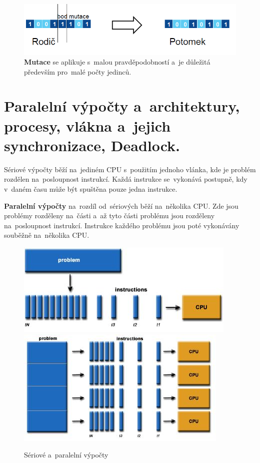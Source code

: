 \begin{figure}[ht]
	\includegraphics[scale=0.7]{images/mutace.PNG}
	\caption{\textbf{Mutace} se aplikuje s~malou pravděpodobností a~je důležitá především pro~malé počty jedinců.}
	\label{mutace}
\end{figure}

\clearpage
\section{Paralelní výpočty a~architektury, procesy, vlákna a~jejich synchronizace, Deadlock.}

Sériové výpočty běží na~jediném CPU s~použitím jednoho vlánka, kde je problém rozdělen na~posloupnost instrukcí. Každá instrukce se~vykonává postupně, kdy v~daném času může být spuštěna pouze jedna instrukce.

\textbf{Paralelní výpočty} na~rozdíl od~sériových běží na~několika CPU. Zde jsou problémy rozděleny na~části a~až tyto části problému jsou rozděleny na~posloupnost instrukcí. Instrukce každého problému jsou poté vykonávány souběžně na~několika CPU.

\begin{figure}[ht]
	\centering
	\includegraphics[scale=0.7]{images/serialComputing.JPG}
	\hspace*{1em}
	\includegraphics[scale=0.7]{images/parallelComputing.JPG}

	\caption{Sériové a~paralelní výpočty}
\end{figure}

